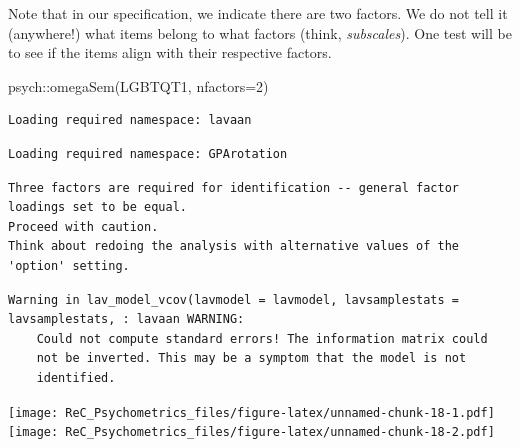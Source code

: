 \documentclass[
  english,
]{book}
\newenvironment{Shaded}{\begin{snugshade}}{\end{snugshade}}
\newcommand{\AttributeTok}[1]{\textcolor[rgb]{0.77,0.63,0.00}{#1}}
\newcommand{\DecValTok}[1]{\textcolor[rgb]{0.00,0.00,0.81}{#1}}
\newcommand{\FunctionTok}[1]{\textcolor[rgb]{0.00,0.00,0.00}{#1}}
\newcommand{\NormalTok}[1]{#1}
\newcommand{\SpecialCharTok}[1]{\textcolor[rgb]{0.00,0.00,0.00}{#1}}
\begin{document}
Note that in our specification, we indicate there are two factors. We do not tell it (anywhere!) what items belong to what factors (think, \emph{subscales}). One test will be to see if the items align with their respective factors.

\begin{Shaded}
\begin{Highlighting}[]
\NormalTok{psych}\SpecialCharTok{::}\FunctionTok{omegaSem}\NormalTok{(LGBTQT1, }\AttributeTok{nfactors=}\DecValTok{2}\NormalTok{)}
\end{Highlighting}
\end{Shaded}

\begin{verbatim}
Loading required namespace: lavaan
\end{verbatim}

\begin{verbatim}
Loading required namespace: GPArotation
\end{verbatim}

\begin{verbatim}
Three factors are required for identification -- general factor loadings set to be equal. 
Proceed with caution. 
Think about redoing the analysis with alternative values of the 'option' setting.
\end{verbatim}

\begin{verbatim}
Warning in lav_model_vcov(lavmodel = lavmodel, lavsamplestats = lavsamplestats, : lavaan WARNING:
    Could not compute standard errors! The information matrix could
    not be inverted. This may be a symptom that the model is not
    identified.
\end{verbatim}

\texttt{[image: ReC\_Psychometrics\_files/figure-latex/unnamed-chunk-18-1.pdf]} \texttt{[image: ReC\_Psychometrics\_files/figure-latex/unnamed-chunk-18-2.pdf]}
\end{document}
